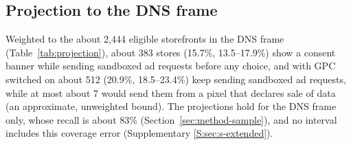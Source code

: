 \subsection{Projection to the DNS frame}\label{sec:app-projection}

Weighted to the about 2,444 eligible storefronts in the DNS frame (Table~\ref{tab:projection}), about 383 stores (15.7\%, 13.5--17.9\%) show a consent banner while sending sandboxed ad requests before any choice, and with GPC switched on about 512 (20.9\%, 18.5--23.4\%) keep sending sandboxed ad requests, while at most about 7 would send them from a pixel that declares sale of data (an approximate, unweighted bound). The projections hold for the DNS frame only, whose recall is about 83\% (Section~\ref{sec:method-sample}), and no interval includes this coverage error (Supplementary \ref*{S:sec:s-extended}).

\begin{table}[!tbp]
\centering
\caption{Projection to the about 2,444 DNS-flagged storefronts in the Tranco top 200,000 (Section~\ref{sec:method-sample}), stratified by rank bucket with design weights; intervals are design-based and include the uncertainty of the frame size.}
\label{tab:projection}
\small
{}%
\end{table}

